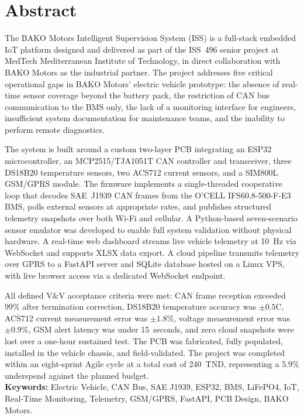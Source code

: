 
\section*{Abstract}

\vspace{1.4cm}
\large
\noindent

The BAKO Motors Intelligent Supervision System (ISS) is a full-stack embedded IoT platform designed and delivered as part of the ISS~496 senior project at MedTech Mediterranean Institute of Technology, in direct collaboration with BAKO Motors as the industrial partner. The project addresses five critical operational gaps in BAKO Motors' electric vehicle prototype: the absence of real-time sensor coverage beyond the battery pack, the restriction of CAN bus communication to the BMS only, the lack of a monitoring interface for engineers, insufficient system documentation for maintenance teams, and the inability to perform remote diagnostics.

The system is built around a custom two-layer PCB integrating an ESP32 microcontroller, an MCP2515/TJA1051T CAN controller and transceiver, three DS18B20 temperature sensors, two ACS712 current sensors, and a SIM800L GSM/GPRS module. The firmware implements a single-threaded cooperative loop that decodes SAE~J1939 CAN frames from the O'CELL IFS60.8-500-F-E3 BMS, polls external sensors at appropriate rates, and publishes structured telemetry snapshots over both Wi-Fi and cellular. A Python-based seven-scenario sensor emulator was developed to enable full system validation without physical hardware. A real-time web dashboard streams live vehicle telemetry at 10~Hz via WebSocket and supports XLSX data export. A cloud pipeline transmits telemetry over GPRS to a FastAPI server and SQLite database hosted on a Linux VPS, with live browser access via a dedicated WebSocket endpoint.

All defined V\&V acceptance criteria were met: CAN frame reception exceeded 99\% after termination correction, DS18B20 temperature accuracy was $\pm 0.5$\textdegree{}C, ACS712 current measurement error was $\pm 1.8\%$, voltage measurement error was $\pm 0.9\%$, GSM alert latency was under 15~seconds, and zero cloud snapshots were lost over a one-hour sustained test. The PCB was fabricated, fully populated, installed in the vehicle chassis, and field-validated. The project was completed within an eight-sprint Agile cycle at a total cost of 240~TND, representing a 5.9\% underspend against the planned budget.\\

\textbf{Keywords:} Electric Vehicle, CAN Bus, SAE J1939, ESP32, BMS, LiFePO4, IoT, Real-Time Monitoring, Telemetry, GSM/GPRS, FastAPI, PCB Design, BAKO Motors.
